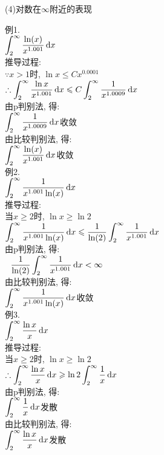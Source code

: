 (4)对数在$\infty$附近的表现
\begin{center}
\end{center}

例1.\\
\phantom{例}$\displaystyle\int_2^{\infty}\frac{\ln(x)}{x^{1.001}}\mathop{}\!\mathrm{d} x$\\
推导过程:\\
$\because x>1$时, $\ln x\leqslant Cx^{0.0001}$\\
$\displaystyle\therefore\int_2^\infty\frac{\ln x}{x^{1.001}}\mathop{}\!\mathrm{d} x\leqslant C\int_2^\infty\frac{1}{x^{1.0009}}\mathop{}\!\mathrm{d} x$\\
由p判别法, 得:\\
$\displaystyle\int_2^{\infty}\frac{1}{x^{1.0009}}\mathop{}\!\mathrm{d} x$收敛\\
由比较判别法, 得:\\
$\displaystyle\int_2^{\infty}\frac{\ln(x)}{x^{1.001}}\mathop{}\!\mathrm{d} x$收敛\\[1ex]

例2.\\
$\displaystyle\int_2^{\infty}\frac{1}{x^{1.001}\ln(x)}\mathop{}\!\mathrm{d} x$\\
推导过程:\\
当$x\geqslant 2$时, $\ln x\geqslant\ln 2$\\
$\displaystyle\int_2^{\infty}\frac{1}{x^{1.001}\ln(x)}\mathop{}\!\mathrm{d} x\leqslant\frac{1}{\ln(2)}\int_2^{\infty}\frac{1}{x^{1.001}}\mathop{}\!\mathrm{d} x$\\
由p判别法, 得:\\
$\displaystyle\phantom{\because}\frac{1}{\ln(2)}\int_2^{\infty}\frac{1}{x^{1.001}}\mathop{}\!\mathrm{d} x<\infty$\\
由比较判别法, 得:\\
$\displaystyle\int_2^{\infty}\frac{1}{x^{1.001}\ln(x)}\mathop{}\!\mathrm{d} x$收敛\\[1ex]

例3.\\
\phantom{例}$\displaystyle\int_2^\infty\frac{\ln x}{x}\mathop{}\!\mathrm{d} x$\\
推导过程:\\
当$x\geqslant 2$时, $\ln x\geqslant\ln 2$\\
$\displaystyle\therefore\int_2^\infty\frac{\ln x}{x}\mathop{}\!\mathrm{d} x\geqslant\ln 2\int_2^\infty\frac{1}{x}\mathop{}\!\mathrm{d} x$\\
由p判别法, 得:\\
$\displaystyle\int_2^\infty\frac{1}{x}\mathop{}\!\mathrm{d} x$发散\\
由比较判别法, 得:\\
$\displaystyle\int_2^\infty\frac{\ln x}{x}\mathop{}\!\mathrm{d} x$发散\\[1ex]

